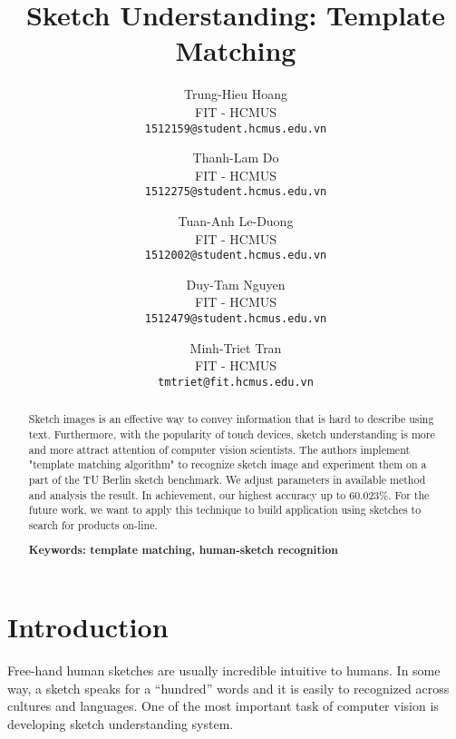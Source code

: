 \documentclass[10pt,twocolumn,letterpaper]{article}
\begin{document}
\title{Sketch Understanding: Template Matching}

\author{
Trung-Hieu Hoang\\
FIT - HCMUS\\
{\tt\small 1512159@student.hcmus.edu.vn}
\and
Thanh-Lam Do\\
FIT - HCMUS\\
{\tt\small 1512275@student.hcmus.edu.vn}
\and
Tuan-Anh Le-Duong\\
FIT - HCMUS\\
{\tt\small 1512002@student.hcmus.edu.vn}
\and
Duy-Tam Nguyen\\
FIT - HCMUS\\
{\tt\small 1512479@student.hcmus.edu.vn}
\and
Minh-Triet Tran\\
FIT - HCMUS\\
{\tt\small tmtriet@fit.hcmus.edu.vn}
}

\maketitle

\begin{abstract}
   Sketch images is an effective way to convey information that is hard to describe using text. Furthermore, with the popularity of touch devices, sketch understanding is more and more attract attention of computer vision scientists. The authors implement "template matching algorithm" to recognize sketch image and experiment them on a part of the TU Berlin sketch benchmark. We adjust parameters in available method and analysis the result. In achievement,  our highest accuracy up to 60.023\%. For the future work, we want to apply this technique to build application using sketches to search for products on-line.
   
   	\bfseries {Keywords:}
   	\mdseries template matching, human-sketch recognition  
\end{abstract}

\section{Introduction}
Free-hand human sketches are usually incredible intuitive to humans. In some way, a sketch speaks for a “hundred” words and it is easily to recognized across cultures and languages. One of the most important task of computer vision is developing sketch understanding system. 
\end{document}
